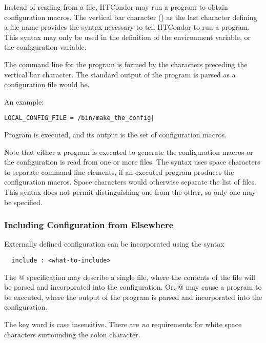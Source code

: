 Instead of reading from a file,
HTCondor may run a program to obtain configuration macros.
The vertical bar character (\Bar) as the last character defining
a file name provides the syntax necessary to tell 
HTCondor to run a program.
This syntax may only be used in the definition of
the  environment variable,
or the  configuration variable.

The command line for the program 
is formed by the characters preceding the vertical bar character.
The standard output of the program is parsed as a configuration 
file would be.

An example:
\begin{verbatim}
LOCAL_CONFIG_FILE = /bin/make_the_config|
\end{verbatim}

Program  is executed, and its output
is the set of configuration macros.

Note that either a program is executed to generate the
configuration macros or the configuration is read from 
one or more files.
The syntax uses space characters to separate command line elements,
if an executed program produces the configuration macros.
Space characters would otherwise separate the list of files.
This syntax does not permit distinguishing one from the other,
so only one may be specified.

\subsubsection{\label{sec:Config-Include}Including Configuration from Elsewhere}
Externally defined configuration can be incorporated using the syntax
\begin{verbatim}
  include : <what-to-include>
\end{verbatim}

The @ specification may describe a single file,
where the contents of the file will be parsed and incorporated
into the configuration.
Or, @  may cause a program to be executed,
where the output of the program is parsed and incorporated
into the configuration.

The  key word is case insensitive.
There are \emph{no} requirements for white space characters surrounding
the colon character.

